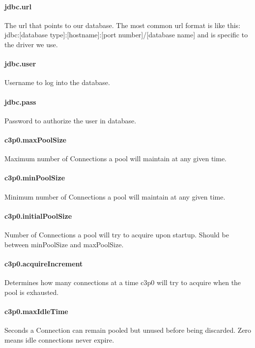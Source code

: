 \paragraph{jdbc.url}
 The url that points to our database. The most common url format is like this:
jdbc:[database type]:[hostname]:[port number]/[database name]
and is specific to the driver we use.

\paragraph{jdbc.user}
Username to log into the database.
\paragraph{jdbc.pass}
Password to authorize the user in database.


\paragraph{c3p0.maxPoolSize}
Maximum number of Connections a pool will maintain at any given time.

\paragraph{c3p0.minPoolSize}
Minimum number of Connections a pool will maintain at any given time.

\paragraph{c3p0.initialPoolSize}
Number of Connections a pool will try to acquire upon startup. Should be between
minPoolSize and maxPoolSize.

\paragraph{c3p0.acquireIncrement}
Determines how many connections at a time c3p0 will try to acquire when the pool
is exhausted.

\paragraph{c3p0.maxIdleTime}
Seconds a Connection can remain pooled but unused before being discarded. Zero
means idle connections never expire.

